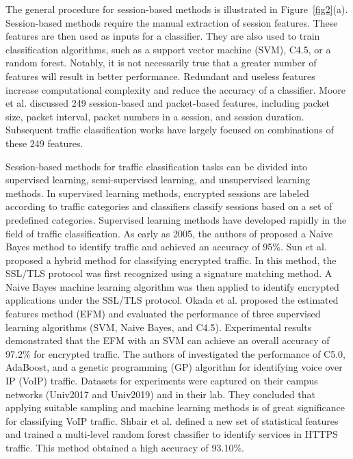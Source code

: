 \documentclass[preprint,12pt]{elsarticle}
\begin{document}
The general procedure for session-based methods is illustrated in Figure~\ref{fig2}(a). Session-based methods require the manual extraction of session features. These features are then used as inputs for a classifier. They are also used to train classification algorithms, such as a support vector machine (SVM), C4.5, or a random forest. Notably, it is not necessarily true that a greater number of features will result in better performance. Redundant and useless features increase computational complexity and reduce the accuracy of a classifier. Moore et al. \cite{moore2013discriminators} discussed 249 session-based and packet-based features, including packet size, packet interval, packet numbers in a session, and session duration. Subsequent traffic classification works have largely focused on combinations of these 249 features.

Session-based methods for traffic classification tasks can be divided into supervised learning, semi-supervised learning, and unsupervised learning methods. In supervised learning methods, encrypted sessions are labeled according to traffic categories and classifiers classify sessions based on a set of predefined categories. Supervised learning methods have developed rapidly in the field of traffic classification. As early as 2005, the authors of \cite{Moore:2005} proposed a Naive Bayes method to identify traffic and achieved an accuracy of 95\%. Sun et al. \cite{Sun} proposed a hybrid method for classifying encrypted traffic. In this method, the SSL/TLS protocol was first recognized using a signature matching method. A Naive Bayes machine learning algorithm was then applied to identify encrypted applications under the SSL/TLS protocol. Okada et al. \cite{okada2011comparisons} proposed the estimated features method (EFM) and evaluated the performance of three supervised learning algorithms (SVM, Naive Bayes, and C4.5). Experimental results demonstrated that the EFM with an SVM can achieve an overall accuracy of 97.2\% for encrypted traffic. The authors of \cite{ALSHAMMARI201577} investigated the performance of C5.0, AdaBoost, and a genetic programming (GP) algorithm for identifying voice over IP (VoIP) traffic. Datasets for experiments were captured on their campus networks (Univ2017 and Univ2019) and in their lab. They concluded that applying suitable sampling and machine learning methods is of great significance for classifying VoIP traffic.
Shbair et al. \cite{shbair2016multi} defined a new set of statistical features and trained a multi-level random forest classifier to identify services in HTTPS traffic. This method obtained a high accuracy of 93.10\%. 
\end{document}
